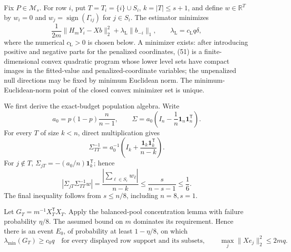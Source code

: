 Fix \(P\in\mathcal M_s\).  For row \(i\), put \(T=T_i=\{i\}\cup S_i\), \(k=|T|\le s+1\), and define \(w\in\mathbb R^T\) by \(w_i=0\) and \(w_j=\operatorname{sign}(\Gamma_{ij})\) for \(j\in S_i\).  The estimator minimizes
\[
 \frac1{2m}\lVert H_mY_i-Xb\rVert_2^2
 +\lambda_{\mathrm L}\lVert b_{-i}\rVert_1,
 \qquad \lambda_{\mathrm L}=c_{\mathrm L}q\delta,
 \tag{51}
\]
where the numerical \(c_{\mathrm L}>0\) is chosen below.  A minimizer exists: after introducing positive and negative parts for the penalized coordinates, (51) is a finite-dimensional convex quadratic program whose lower level sets have compact images in the fitted-value and penalized-coordinate variables; the unpenalized null directions may be fixed by minimum Euclidean norm.  The minimum-Euclidean-norm point of the closed convex minimizer set is unique.

We first derive the exact-budget population algebra.  Write
\[
 a_0=p(1-p)\frac n{n-1},
 \qquad
 \Sigma=a_0\left(I_n-\frac1n\mathbf1_n\mathbf1_n^{\mathsf T}\right).
\]
For every \(T\) of size \(k<n\), direct multiplication gives
\[
 \Sigma_{TT}^{-1}=a_0^{-1}
 \left(I_k+\frac{\mathbf1_k\mathbf1_k^{\mathsf T}}{n-k}\right).
 \tag{52}
\]
For \(j\notin T\), \(\Sigma_{jT}=-(a_0/n)\mathbf1_k^{\mathsf T}\); hence
\[
 \left|\Sigma_{jT}\Sigma_{TT}^{-1}w\right|
 =\frac{|\sum_{\ell\in S_i}w_\ell|}{n-k}
 \le\frac{s}{n-s-1}\le\frac16.
 \tag{53}
\]
The final inequality follows from \(s\le n/8\), including \(n=8,s=1\).

Let \(G_T=m^{-1}X_T^{\mathsf T}X_T\).  Apply the balanced-pool concentration lemma with failure probability \(\eta/8\).  The assumed bound on \(m\) dominates its requirement.  Hence there is an event \(E_0\), of probability at least \(1-\eta/8\), on which
\[
 \lambda_{\min}(G_T)\ge c_0q
 \quad\text{for every displayed row support and its subsets},
 \qquad
 \max_j\lVert Xe_j\rVert_2^2\le2mq.
 \tag{54}
\]

